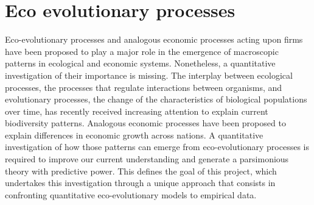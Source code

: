 \section{Eco evolutionary processes}
\begin{outline}
    \1 Eco-evolutionary processes and analogous economic processes acting upon firms have been proposed to play a major role in the emergence of macroscopic patterns in ecological and economic systems. Nonetheless, a quantitative investigation of their importance is missing.
        \2 The interplay between ecological processes, the processes that regulate interactions between organisms, and evolutionary processes, the change of the characteristics of biological populations over time, has recently received increasing attention to explain current biodiversity patterns. 
        \2 Analogous economic processes have been proposed to explain differences in economic growth across nations.
    \1 A quantitative investigation of how those patterns can emerge from eco-evolutionary processes is required to improve our current understanding and generate a parsimonious theory with predictive power. This defines the goal of this project, which undertakes this investigation through a unique approach that consists in confronting quantitative eco-evolutionary models to empirical data.
\end{outline}

